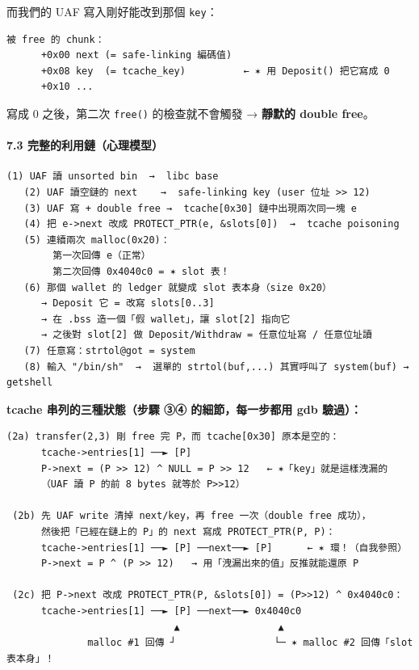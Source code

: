 \documentclass[10pt,a4paper]{article}
\begin{document}
而我們的 UAF 寫入剛好能改到那個 \texttt{key}：

\begin{Verbatim}[breaklines=true,breakanywhere=true,breakautoindent=false,fontsize=\fontsize{7.0}{9.5}\selectfont]
   被 free 的 chunk：
      +0x00 next (= safe-linking 編碼值)
      +0x08 key  (= tcache_key)          ← ✶ 用 Deposit() 把它寫成 0
      +0x10 ...
\end{Verbatim}

寫成 0 之後，第二次 \texttt{free()} 的檢查就不會觸發 → \textbf{靜默的
double free}。

\paragraph{7.3
完整的利用鏈（心理模型）}\label{ux5b8cux6574ux7684ux5229ux7528ux93c8ux5fc3ux7406ux6a21ux578b}

\begin{Verbatim}[breaklines=true,breakanywhere=true,breakautoindent=false,fontsize=\fontsize{7.0}{9.5}\selectfont]
   (1) UAF 讀 unsorted bin  →  libc base
   (2) UAF 讀空鏈的 next    →  safe-linking key (user 位址 >> 12)
   (3) UAF 寫 + double free →  tcache[0x30] 鏈中出現兩次同一塊 e
   (4) 把 e->next 改成 PROTECT_PTR(e, &slots[0])  →  tcache poisoning
   (5) 連續兩次 malloc(0x20)：
        第一次回傳 e（正常）
        第二次回傳 0x4040c0 = ✶ slot 表！
   (6) 那個 wallet 的 ledger 就變成 slot 表本身（size 0x20）
      → Deposit 它 = 改寫 slots[0..3]
      → 在 .bss 造一個「假 wallet」，讓 slot[2] 指向它
      → 之後對 slot[2] 做 Deposit/Withdraw = 任意位址寫 / 任意位址讀
   (7) 任意寫：strtol@got = system
   (8) 輸入 "/bin/sh"  →  選單的 strtol(buf,...) 其實呼叫了 system(buf) → getshell
\end{Verbatim}

\textbf{tcache 串列的三種狀態（步驟 ③④ 的細節，每一步都用 gdb 驗過）：}

\begin{Verbatim}[breaklines=true,breakanywhere=true,breakautoindent=false,fontsize=\fontsize{7.0}{9.5}\selectfont]
 (2a) transfer(2,3) 剛 free 完 P，而 tcache[0x30] 原本是空的：
      tcache->entries[1] ──► [P]
      P->next = (P >> 12) ^ NULL = P >> 12   ← ✶「key」就是這樣洩漏的
      （UAF 讀 P 的前 8 bytes 就等於 P>>12）

 (2b) 先 UAF write 清掉 next/key，再 free 一次（double free 成功），
      然後把「已經在鏈上的 P」的 next 寫成 PROTECT_PTR(P, P)：
      tcache->entries[1] ──► [P] ──next──► [P]      ← ✶ 環！（自我參照）
      P->next = P ^ (P >> 12)   → 用「洩漏出來的值」反推就能還原 P

 (2c) 把 P->next 改成 PROTECT_PTR(P, &slots[0]) = (P>>12) ^ 0x4040c0：
      tcache->entries[1] ──► [P] ──next──► 0x4040c0
                             ▲                 ▲
              malloc #1 回傳 ┘                 └─ ✶ malloc #2 回傳「slot 表本身」！
\end{Verbatim}
\end{document}
